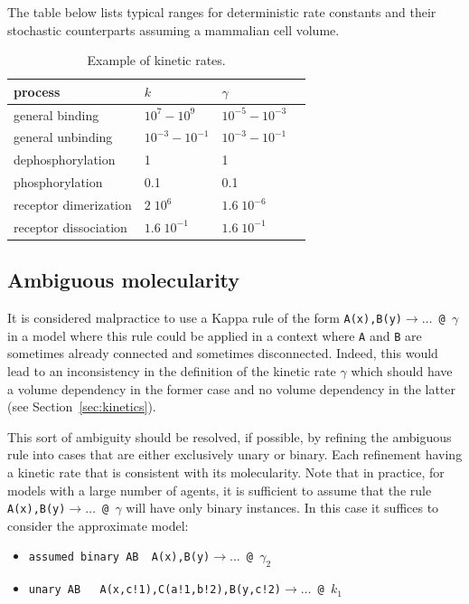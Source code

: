 \documentclass[11pt]{book}
\def\ttt#1{\texttt{#1}}
\def\rar{\rightarrow}
\def\ga{\gamma}
\begin{document}
The table below lists typical ranges for deterministic rate constants and 
their stochastic counterparts assuming a mammalian cell volume.

\begin{table}[htbp]
\centering
\caption{Example of kinetic rates.}
\begin{tabular}{@{} lllr @{} }
\toprule
process & $k$ & $\gamma$ %
\\
\midrule
general binding & $10^{7}-10^{9}$ & $10^{-5}-10^{-3}$ %
\\
general unbinding &  $10^{-3} - 10^{-1}$ & $10^{-3}-10^{-1}$ %
\\
dephosphorylation & 1 & 1 %
\\
phosphorylation & 0.1 & 0.1 %
\\
receptor dimerization & $2\; 10^{6}$ & $1.6 \;10^{-6}$ %
\\
receptor dissociation & $1.6\; 10^{-1}$ & $1.6\; 10^{-1}$ %
\\
\bottomrule
\end{tabular}
\end{table}

\subsection{Ambiguous molecularity}\label{sec:ambiguous}

It is considered malpractice to use a Kappa rule of the form \ttt{A(x),B(y)$\rar \dots$ @ $\ga$} in a model where this rule could be applied in a context where \ttt{A} and \ttt{B} are sometimes already connected and sometimes disconnected. Indeed, this would lead to an inconsistency in the definition of the kinetic rate $\ga$ which should have a volume dependency in the former case and no volume dependency in the latter (see Section~\ref{sec:kinetics}). 

This sort of ambiguity should be resolved, if possible, by refining the ambiguous rule into cases that are either exclusively unary or binary. Each refinement having a kinetic rate that is consistent with its molecularity. Note that in practice, for models with a large number of agents, it is sufficient to assume that the rule \ttt{A(x),B(y)$\rar \dots$ @ $\ga$} will have only binary instances. In this case it suffices to consider the approximate model:
\begin{itemize}
\item[]\ttt{{\textquotesingle}assumed binary AB{\textquotesingle}~  A(x),B(y)$\rar \dots$ @ $\ga_2$}
\item[]\ttt{{\textquotesingle}unary AB{\textquotesingle} ~ A(x,c!1),C(a!1,b!2),B(y,c!2)$\rar \dots$ @ $k_1$}
\end{itemize}
\end{document}
